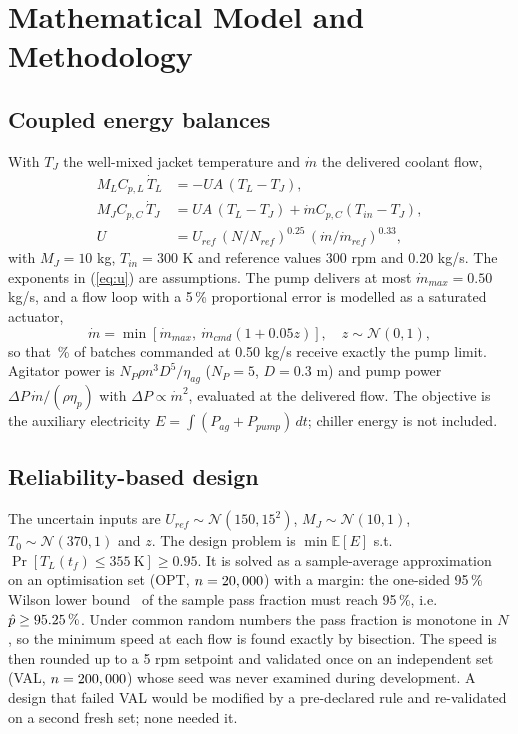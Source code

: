 \documentclass[conference,letterpaper]{IEEEtran}
\newcommand{\mdot}{\dot m}
\begin{document}
\section{Mathematical Model and Methodology}
\subsection{Coupled energy balances}
With \(T_J\) the well-mixed jacket temperature and \(\mdot\) the delivered coolant flow,
\begin{align}
M_LC_{p,L}\,\dot T_L &= -UA\,(T_L - T_J), \label{eq:l}\\
M_JC_{p,C}\,\dot T_J &= UA\,(T_L - T_J) + \mdot C_{p,C}(T_{in} - T_J), \label{eq:j}\\
U &= U_{ref}\,(N/N_{ref})^{0.25}\,(\mdot/\mdot_{ref})^{0.33}, \label{eq:u}
\end{align}
with \(M_J = 10\) kg, \(T_{in} = 300\) K and reference values 300 rpm and 0.20 kg/s. The exponents in (\ref{eq:u}) are assumptions. The pump delivers at most \(\mdot_{max} = 0.50\) kg/s, and a flow loop with a 5\,\% proportional error is modelled as a saturated actuator,
\begin{equation}
\mdot = \min\left[\mdot_{max},\ \mdot_{cmd}(1 + 0.05z)\right],\quad z \sim \mathcal N(0,1), \label{eq:act}
\end{equation}
so that \vFracAtCap\,\% of batches commanded at 0.50 kg/s receive exactly the pump limit. Agitator power is \(N_P\rho n^3D^5/\eta_{ag}\) (\(N_P = 5\), \(D = 0.3\) m) and pump power \(\Delta P\,\mdot/(\rho\eta_p)\) with \(\Delta P \propto \mdot^2\), evaluated at the delivered flow. The objective is the auxiliary electricity \(E = \int (P_{ag} + P_{pump})\,dt\); chiller energy is not included.

\subsection{Reliability-based design}
The uncertain inputs are \(U_{ref} \sim \mathcal N(150, 15^2)\), \(M_J \sim \mathcal N(10, 1)\), \(T_0 \sim \mathcal N(370, 1)\) and \(z\). The design problem is \(\min \mathbb E[E]\) s.t.\ \(\Pr[T_L(t_f) \le 355\ \mathrm K] \ge 0.95\). It is solved as a sample-average approximation~\cite{b3} on an optimisation set (OPT, \(n = 20,000\)) with a margin: the one-sided 95\,\% Wilson lower bound~\cite{b4} of the sample pass fraction must reach 95\,\%, i.e.\ \(\hat p \ge 95.25\,\%\). Under common random numbers the pass fraction is monotone in \(N\), so the minimum speed at each flow is found exactly by bisection. The speed is then rounded up to a 5 rpm setpoint and validated once on an independent set (VAL, \(n = 200,000\)) whose seed was never examined during development. A design that failed VAL would be modified by a pre-declared rule and re-validated on a second fresh set; none needed it.
\end{document}
